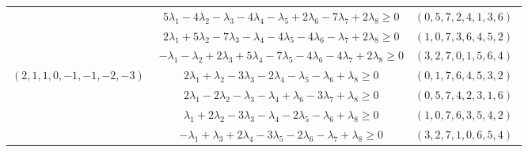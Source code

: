 \documentclass[11pt]{article}
\begin{document}
\begin{longtable}[l]{|c|c|c|}
 \cline{2-3} 
 & $5\lambda_{1}-4\lambda_{2}-\lambda_{3}-4\lambda_{4}-\lambda_{5} + 2\lambda_{6}-7\lambda_{7} + 2\lambda_{8}\geq 0$ & $(0 ,5 ,7 ,2 ,4 ,1 ,3 ,6) \;$\\ 
 \cline{2-3} 
 & $2\lambda_{1} + 5\lambda_{2}-7\lambda_{3}-\lambda_{4}-4\lambda_{5}-4\lambda_{6}-\lambda_{7} + 2\lambda_{8}\geq 0$ & $(1 ,0 ,7 ,3 ,6 ,4 ,5 ,2) \;$\\ 
 \cline{2-3} 
 & $-\lambda_{1}-\lambda_{2} + 2\lambda_{3} + 5\lambda_{4}-7\lambda_{5}-4\lambda_{6}-4\lambda_{7} + 2\lambda_{8}\geq 0$ & $(3 ,2 ,7 ,0 ,1 ,5 ,6 ,4) \;$\\ \hline\multirow[t]{4}{*}{ $(2 ,1 ,1 ,0 ,-1 ,-1 ,-2 ,-3) \;$ }  & $2\lambda_{1} + \lambda_{2}-3\lambda_{3}-2\lambda_{4}-\lambda_{5}-\lambda_{6} + \lambda_{8}\geq 0$ & $(0 ,1 ,7 ,6 ,4 ,5 ,3 ,2) \;$\\ 
 \cline{2-3} 
 & $2\lambda_{1}-2\lambda_{2}-\lambda_{3}-\lambda_{4} + \lambda_{6}-3\lambda_{7} + \lambda_{8}\geq 0$ & $(0 ,5 ,7 ,4 ,2 ,3 ,1 ,6) \;$\\ 
 \cline{2-3} 
 & $\lambda_{1} + 2\lambda_{2}-3\lambda_{3}-\lambda_{4}-2\lambda_{5}-\lambda_{6} + \lambda_{8}\geq 0$ & $(1 ,0 ,7 ,6 ,3 ,5 ,4 ,2) \;$\\ 
 \cline{2-3} 
 & $-\lambda_{1} + \lambda_{3} + 2\lambda_{4}-3\lambda_{5}-2\lambda_{6}-\lambda_{7} + \lambda_{8}\geq 0$ & $(3 ,2 ,7 ,1 ,0 ,6 ,5 ,4) \;$\\ \hline
  
 \end{longtable} 
 
\end{document}
